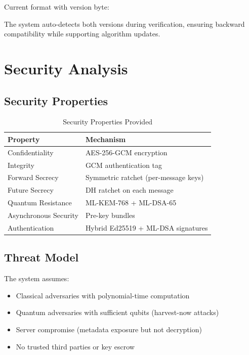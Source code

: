 \documentclass[12pt,a4paper]{article}
\begin{document}
Current format with version byte:
\begin{equation}
[0x01][\text{4-byte Ed25519 sig length}][\text{Ed25519 sig}][\text{ML-DSA sig}]
\end{equation}

The system auto-detects both versions during verification, ensuring backward compatibility while supporting algorithm updates.

\section{Security Analysis}

\subsection{Security Properties}

\begin{table}[h]
\centering
\caption{Security Properties Provided}
\begin{tabular}{@{}ll@{}}
\toprule
Property & Mechanism \\ \midrule
Confidentiality & AES-256-GCM encryption \\
Integrity & GCM authentication tag \\
Forward Secrecy & Symmetric ratchet (per-message keys) \\
Future Secrecy & DH ratchet on each message \\
Quantum Resistance & ML-KEM-768 + ML-DSA-65 \\
Asynchronous Security & Pre-key bundles \\
Authentication & Hybrid Ed25519 + ML-DSA signatures \\ \bottomrule
\end{tabular}
\end{table}

\subsection{Threat Model}

The system assumes:
\begin{itemize}
    \item Classical adversaries with polynomial-time computation
    \item Quantum adversaries with sufficient qubits (harvest-now attacks)
    \item Server compromise (metadata exposure but not decryption)
    \item No trusted third parties or key escrow
\end{itemize}
\end{document}

